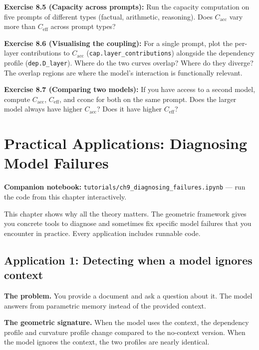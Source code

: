 \documentclass[11pt, twoside, openright]{memoir}
\newcommand{\notebook}[1]{%
  \begin{tcolorbox}[enhanced, colback=LBlue!30, colframe=Blue!60,
    left=4pt, right=4pt, top=3pt, bottom=3pt, boxrule=0.6pt, arc=2pt,
    before skip=6pt, after skip=10pt]
    {\small\sffamily\color{Navy} \textbf{Companion notebook:}
    \texttt{tutorials/#1} --- run the code from this chapter interactively.}
  \end{tcolorbox}%
}
\begin{document}
\begin{tryit}
\textbf{Exercise 8.5 (Capacity across prompts):} Run the capacity
computation on five prompts of different types (factual, arithmetic,
reasoning). Does $C_{\mathrm{acc}}$ vary more than $C_{\mathrm{eff}}$
across prompt types?

\textbf{Exercise 8.6 (Visualising the coupling):} For a single prompt,
plot the per-layer contributions to $C_{\mathrm{acc}}$
(\texttt{cap.layer\_contributions}) alongside the dependency profile
(\texttt{dep.D\_layer}). Where do the two curves overlap? Where do they
diverge?  The overlap regions are where the model's interaction is
functionally relevant.

\textbf{Exercise 8.7 (Comparing two models):} If you have access to a
second model, compute $C_{\mathrm{acc}}$, $C_{\mathrm{eff}}$, and
$\mathrm{cconc}$ for both on the same prompt. Does the larger model
always have higher $C_{\mathrm{acc}}$? Does it have higher
$C_{\mathrm{eff}}$?
\end{tryit}


\chapter{Practical Applications: Diagnosing Model Failures}
\label{chap:applications}

\notebook{ch9\_diagnosing\_failures.ipynb}

\begin{whycare}
This chapter shows why all the theory matters. The geometric framework gives
you concrete tools to diagnose and sometimes fix specific model failures
that you encounter in practice. Every application includes runnable code.
\end{whycare}

\section{Application 1: Detecting when a model ignores context}

\textbf{The problem.} You provide a document and ask a question about it.
The model answers from parametric memory instead of the provided context.

\textbf{The geometric signature.} When the model uses the context, the
dependency profile and curvature profile change compared to the no-context
version. When the model ignores the context, the two profiles are nearly
identical.
\end{document}
